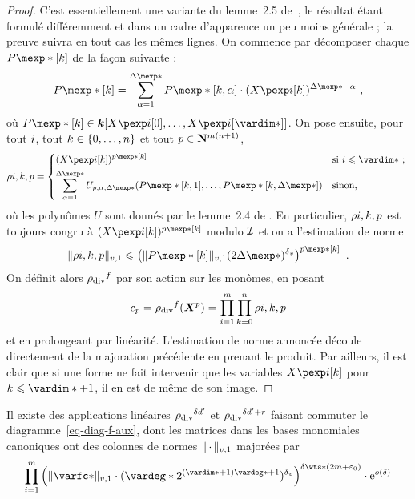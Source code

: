 \begin{proof}
  C'est essentiellement une variante du lemme~2.5 de~\cite{remivg}, le résultat
  étant formulé différemment et dans un cadre d'apparence un peu moins
  générale ; la preuve suivra en tout cas les mêmes lignes. On commence par
  décomposer chaque \( P\mexp*[\ind] \) de la façon suivante :
  \begin{equation}
    P\mexp*[\ind]
    =
    \sum _{\alpha=1}^{\Delta\mexp*}
    P\mexp*[\ind, \alpha] \cdot (\cmh\fct[\ind])^{\Delta\mexp* - \alpha}
    \pmm,
  \end{equation}
  où \( P\mexp*[\ind] \in \cdn [ \cmh\fct[0], \dots, \cmh\fct[\vardim*] ] \).
  On pose ensuite, pour tout \( i \), tout
  \( k \in \{ 0, \dots, n \} \) et tout
  \( p \in {\mathbf{N}}^{m(n+1)} \),
  \begin{equation}
    \rho{\fct, \ind, p}
    =
    \begin{dcases*}
      ( \cmh\fct[\ind] ) ^{p\mexp*[\ind]}
      & si \( \fct \le \vardim* \) ;
      \\
      \sum _{\alpha=1}^{\Delta\mexp*}
      U_{p, \alpha, \Delta\mexp*}
      ( P\mexp*[\ind, 1], \dots, P\mexp*[\ind, \Delta\mexp*] )
      & sinon,
    \end{dcases*}
  \end{equation}
  où les polynômes \( U \) sont donnés par le lemme~2.4 de \cite{remivg}. En
  particulier, \( \rho{i, k, p} \) est toujours congru à
  \( ( \cmh\fct[\ind] ) ^{p\mexp*[\ind]} \) modulo \( \mathcal I \) et on a
  l'estimation de norme
  \begin{equation}
    \nvp1{ \rho{\fct, \ind, p} }
    \le
    \left(
    \nvp1{ P\mexp*[\ind] } (2\Delta\mexp*)^\dv
    \right) ^{p\mexp*[\ind]}
    \pmm.
  \end{equation}
  On définit alors \( { \rho_{\text{\normalfont div}} }^f \) par son action sur les monômes, en posant
  \begin{equation}
    c_p
    = { \rho_{\text{\normalfont div}} }^f(\boldsymbol X^p)
    = \prod_{i =1}^m \prod_{k =0}^n \rho{i, k, p}
  \end{equation}
  et en prolongeant par linéarité. L'estimation de norme annoncée découle
  directement de la majoration précédente en prenant le produit. Par ailleurs,
  il est clair que si une forme ne fait intervenir que les variables \(
  \cmh\fct[\ind] \) pour \( \ind \le \vardim* + 1 \), il en est de même de son
  image.
\end{proof}

\begin{coro} \label{c:hmat-rdiv}
  Il existe des applications linéaires \( { \rho_{\text{\normalfont div}} }^{\delta d'} \) et \( \rdiv^{\Diii} \)
  faisant commuter le diagramme~\eqref{eq-diag-f-aux}, dont les matrices dans
  les bases monomiales canoniques ont des colonnes de normes \( \lVert{\,\cdot\,}\rVert_{v, 1} \)
  majorées par
  \begin{equation}
    \prod\fctrange \left(
    \nvp1{ \varfc* }
    \cdot ( \vardeg* 2^{(\vardim*+1)\vardeg* + 1} )^\dv
    \right) ^{ \delta \wts* (2\puiss + \epsz) }
    \cdot \expb^{ o(\delta) }
  \end{equation}
\end{coro}

